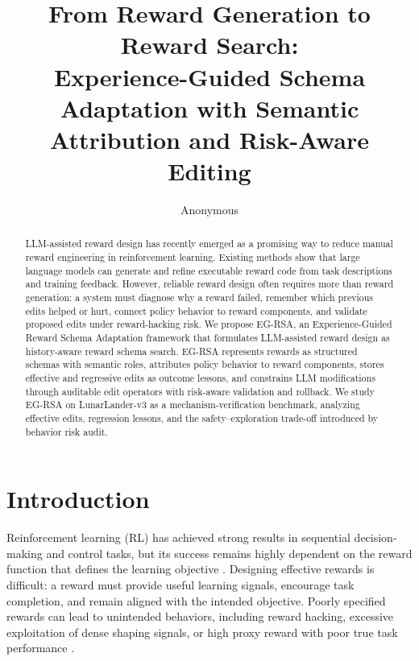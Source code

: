\documentclass[11pt]{article}
\title{From Reward Generation to Reward Search:\\Experience-Guided Schema Adaptation with Semantic Attribution and Risk-Aware Editing}
\author{Anonymous}
\date{}
\begin{document}
\maketitle

\begin{abstract}
LLM-assisted reward design has recently emerged as a promising way to reduce manual reward engineering in reinforcement learning. Existing methods show that large language models can generate and refine executable reward code from task descriptions and training feedback. However, reliable reward design often requires more than reward generation: a system must diagnose why a reward failed, remember which previous edits helped or hurt, connect policy behavior to reward components, and validate proposed edits under reward-hacking risk. We propose EG-RSA, an Experience-Guided Reward Schema Adaptation framework that formulates LLM-assisted reward design as history-aware reward schema search. EG-RSA represents rewards as structured schemas with semantic roles, attributes policy behavior to reward components, stores effective and regressive edits as outcome lessons, and constrains LLM modifications through auditable edit operators with risk-aware validation and rollback. We study EG-RSA on LunarLander-v3 as a mechanism-verification benchmark, analyzing effective edits, regression lessons, and the safety--exploration trade-off introduced by behavior risk audit.
\end{abstract}

\section{Introduction}
\label{sec:introduction}

Reinforcement learning (RL) has achieved strong results in sequential decision-making and control tasks, but its success remains highly dependent on the reward function that defines the learning objective \citep{sutton2018reinforcement}. Designing effective rewards is difficult: a reward must provide useful learning signals, encourage task completion, and remain aligned with the intended objective. Poorly specified rewards can lead to unintended behaviors, including reward hacking, excessive exploitation of dense shaping signals, or high proxy reward with poor true task performance \citep{amodei2016concrete,pan2022effects}.
\end{document}
